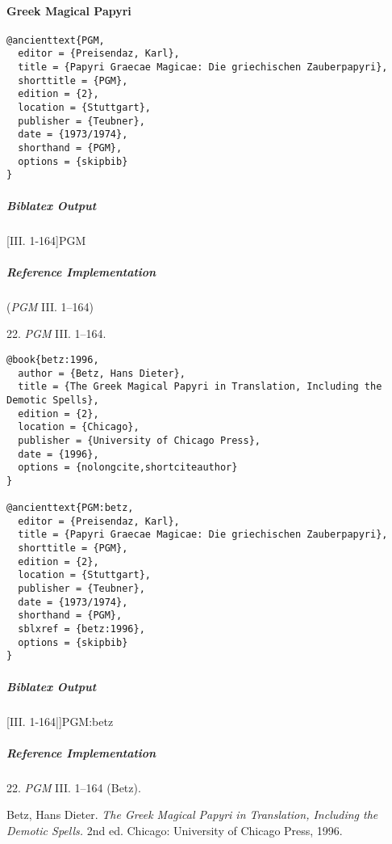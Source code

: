 \documentclass[a4paper]{article}
\newenvironment{biboutput}{%
  \subparagraph{Biblatex Output}
}{\color{black}}
\newenvironment{refimp}{%
  \subparagraph{Reference Implementation}
  \color{reference-colour}
  \rm
}{\par\color{black}}
\begin{document}
\paragraph{Greek Magical Papyri}

\begin{lstlisting}
@ancienttext{PGM,
  editor = {Preisendaz, Karl},
  title = {Papyri Graecae Magicae: Die griechischen Zauberpapyri},
  shorttitle = {PGM},
  edition = {2},
  location = {Stuttgart},
  publisher = {Teubner},
  date = {1973/1974},
  shorthand = {PGM},
  options = {skipbib}
}
\end{lstlisting}

\begin{biboutput}
  [III. 1-164]{PGM}
\end{biboutput}

\begin{refimp}
  (\emph{PGM} III. 1–164)

  22. \emph{PGM} III. 1–164.

\end{refimp}

\medskip

\begin{lstlisting}
@book{betz:1996,
  author = {Betz, Hans Dieter},
  title = {The Greek Magical Papyri in Translation, Including the Demotic Spells},
  edition = {2},
  location = {Chicago},
  publisher = {University of Chicago Press},
  date = {1996},
  options = {nolongcite,shortciteauthor}
}

@ancienttext{PGM:betz,
  editor = {Preisendaz, Karl},
  title = {Papyri Graecae Magicae: Die griechischen Zauberpapyri},
  shorttitle = {PGM},
  edition = {2},
  location = {Stuttgart},
  publisher = {Teubner},
  date = {1973/1974},
  shorthand = {PGM},
  sblxref = {betz:1996},
  options = {skipbib}
}
\end{lstlisting}

\begin{biboutput}
  [III. 1-164|]{PGM:betz}
\end{biboutput}

\begin{refimp}
  22. \emph{PGM} III. 1–164 (Betz).

  \hangindent\bibindent Betz, Hans Dieter. \emph{The Greek Magical Papyri in
  Translation, Including the Demotic Spells.} 2nd ed. Chicago: University of
  Chicago Press, 1996.

\end{refimp}
\end{document}
